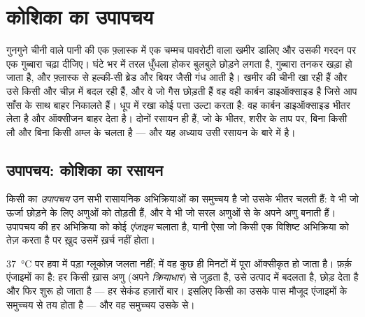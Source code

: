 \chapter{कोशिका का उपापचय}\label{ch:g10:cell-metabolism}

गुनगुने चीनी वाले पानी की एक फ़्लास्क में एक चम्मच पावरोटी वाला खमीर
डालिए और उसकी गरदन पर एक गुब्बारा चढ़ा दीजिए। घंटे भर में तरल धुँधला
होकर बुलबुले छोड़ने लगता है, गुब्बारा तनकर खड़ा हो जाता है, और फ़्लास्क
से हल्की-सी ब्रेड और बियर जैसी गंध आती है। खमीर की  चीनी खा रही
हैं और उसे किसी और चीज़ में बदल रही हैं, और वे जो गैस छोड़ती हैं वह वही
कार्बन डाइऑक्साइड है जिसे आप साँस के साथ बाहर निकालते हैं। धूप में रखा
कोई पत्ता उल्टा करता है: वह कार्बन डाइऑक्साइड भीतर लेता है और ऑक्सीजन
बाहर देता है। दोनों रसायन ही हैं, जो  के भीतर, शरीर के ताप पर,
बिना किसी लौ और बिना किसी अम्ल के चलता है --- और यह अध्याय उसी रसायन के
बारे में है।

\section{उपापचय: कोशिका का रसायन}

\begin{definition}[उपापचय]\label{def:g10:cell-metabolism:metabolism}
किसी  का \emph{उपापचय} उन सभी रासायनिक अभिक्रियाओं
का समुच्चय है जो उसके भीतर चलती हैं: वे भी जो ऊर्जा छोड़ने के लिए अणुओं
को तोड़ती हैं, और वे भी जो सरल अणुओं से  के अपने अणु बनाती हैं।
उपापचय की हर अभिक्रिया को कोई \emph{एंजाइम} चलाता है, यानी
ऐसा  जो किसी एक विशिष्ट अभिक्रिया को तेज़ करता है पर ख़ुद उसमें
ख़र्च नहीं होता।
\end{definition}

\begin{proposition}[एंजाइम ही कोशिका का रसायन संभव बनाते हैं]\label{prop:g10:cell-metabolism:enzymes}
\qty{37}{\celsius} पर हवा में पड़ा ग्लूकोज़ जलता नहीं;  में वह
कुछ ही मिनटों में पूरा ऑक्सीकृत हो जाता है। फ़र्क़ एंजाइमों का है: हर
 किसी ख़ास अणु (अपने \emph{क्रियाधार}) से जुड़ता है, उसे उत्पाद
में बदलता है, छोड़ देता है और फिर शुरू हो जाता है --- हर सेकंड हज़ारों
बार। इसलिए किसी  का  उसके पास मौजूद एंजाइमों के समुच्चय से तय
होता है --- और वह समुच्चय उसके  से।
\end{proposition}
\admitted

